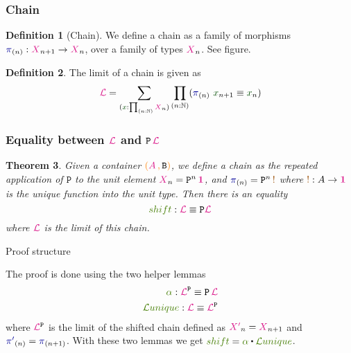 \documentclass[xelatex,mathserif,serif,notheorems]{beamer} %
\theoremstyle{plain} %
\newtheorem{thm}{Theorem}[section]
\theoremstyle{definition}
\newtheorem{defn}[thm]{Definition}%
\theoremstyle{remark}
\newcommand*{\term}[1]{\textcolor{green!30!black}{#1}} %
\newcommand*{\pathterm}[1]{\textcolor{green!65!red!75!black}{#1}}
\newcommand*{\type}[1]{\textcolor{magenta!90!black}{#1}}
\newcommand*{\containerpair}[2]{\ensuremath{\colorlet{savedleftcolor}{.}\color{orange}\left(\color{savedleftcolor}#1\,\textcolor{orange}{\mathbf{,}}\,#2\color{orange}\right)\color{savedleftcolor}}}
\newcommand*{\unit}{\type{\textbf{1}}}
\newcommand*{\constant}[1]{\textcolor{orange!60!black}{\ensuremath{\mathtt{#1}}}}
\newcommand*{\function}[1]{\textcolor{blue!60!black}{\ensuremath{\mathtt{#1}}}}
\newcommand*{\typeformer}[1]{\ensuremath{\mathtt{#1}}}
\newcommand*{\functor}[1]{\ensuremath{\mathbf{\mathtt{#1}}}}
\newcommand{\ct}{%
  \mathchoice{\mathbin{\raisebox{0.5ex}{$\displaystyle\centerdot$}}}%
  {\mathbin{\raisebox{0.5ex}{$\centerdot$}}}%
  {\mathbin{\raisebox{0.25ex}{$\scriptstyle\,\centerdot\,$}}}%
  {\mathbin{\raisebox{0.1ex}{$\scriptscriptstyle\,\centerdot\,$}}}
}
\newcommand{\setlengths}{
  \setlength{\abovedisplayskip}{4pt}
  \setlength{\belowdisplayskip}{4pt}
  \setlength{\abovedisplayshortskip}{2pt}
  \setlength{\belowdisplayshortskip}{2pt}
}
\begin{document}
\begin{frame}[fragile]
  \frametitle{Chain}
  \begin{defn}[Chain]\setlengths
    We define a chain as a family of morphisms \(\function{\pi}_{(n)} : \type{X}_{n+1} \rightarrow \type{X}_{n}\), over a family of types \(\type{X}_{n}\). See figure.
  \end{defn}
  \begin{figure}[h]
    \centering
  \end{figure}
  \begin{defn}\setlengths
    The limit of a chain is given as
    \begin{equation}
      \type{\mathcal{L}} = \sum_{(\term{x} : \prod_{(n : \mathbb{N})} \type{X}_n)} \prod_{(n : \mathbb{N})} (\function{\pi}_{(n)}~\term{x}_{n+1} \equiv \term{x}_n)
    \end{equation}
  \end{defn}
\end{frame}

\begin{frame}
  \frametitle{Equality between \(\type{\mathcal{L}}\) and \(\functor{P}\,\type{\mathcal{L}}\)}
  \begin{thm}\setlengths
    Given a container \(\containerpair{\type{A}}{\typeformer{B}}\), we define a chain as the repeated application of \(\functor{P}\) to the unit element \(\type{X}_n = \functor{P}^n\,\unit\), and \(\function{\pi}_{(n)} = \functor{P}^n\,\constant{!}\) where \(\constant{!} : A \rightarrow \unit\) is the unique function into the unit type. Then there is an equality
    \begin{equation}
      \pathterm{shift} : \type{\mathcal{L}} \equiv \functor{P}\type{\mathcal{L}}
    \end{equation}
    where \(\type{\mathcal{L}}\) is the limit of this chain.
  \end{thm}
  \begin{block}{Proof structure}\setlengths
    The proof is done using the two helper lemmas
    \begin{align}
      \pathterm{\alpha} : \type{\mathcal{L}}^{\functor{P}} \equiv \functor{P}\,\type{\mathcal{L}} \\
      \pathterm{\mathcal{L}unique} : \type{\mathcal{L}} \equiv \type{\mathcal{L}}^{\functor{P}}
    \end{align}
    where \(\type{\mathcal{L}}^{\functor{P}}\) is the limit of the shifted chain defined as \(\type{X'}_n = \type{X}_{n+1}\) and \(\function{\pi'}_{(n)} = \function{\pi}_{(n+1)}\). With these two lemmas we get \(\pathterm{shift} = \pathterm{\alpha} \ct \pathterm{\mathcal{L}unique}\).
  \end{block}
\end{frame}
\end{document}
